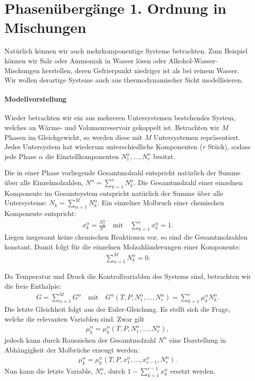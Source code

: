 \section{Phasenübergänge 1. Ordnung in Mischungen}
Natürlich können wir auch mehrkomponentige Systeme betrachten. Zum Beispiel können wir Salz oder Ammoniak in Wasser lösen oder Alkohol-Wasser-Mischungen herstellen, deren Gefrierpunkt niedriger ist als bei reinem Wasser.
Wir wollen derartige Systeme auch aus thermodynamischer Sicht modellisieren.
\paragraph*{Modellvorstellung}
Wieder betrachten wir ein aus mehreren Untersystemen bestehendes System, welches an Wärme- und Volumenreservoir gekoppelt ist. Betrachten wir $M$ Phasen im Gleichgewicht, so werden diese mit $M$ Untersystemen repräsentiert. Jedes Untersystem hat wiederum unterschiedliche Komponenten ($r$ Stück), sodass jede Phase $\alpha$ die Einstellkomponenten $N_1^\alpha,...,N_r^\alpha$ besitzt.

Die in einer Phase vorliegende Gesamtmolzahl entspricht natürlich der Summe über alle Einzelmolzahlen, $N^\alpha=\sum_{k=1}^{r}N_k^\alpha$. Die Gesamtmolzahl einer einzelnen Komponente im Gesamtsystem entspricht natürlich der Summe über alle Untersysteme: $N_k=\sum_{\alpha=1}^{M}N_k^\alpha$.
Ein einzelner Molbruch einer chemischen Komponente entspricht:
\begin{align*}
    x_k^\alpha=\frac{N_k^\alpha}{N^\alpha}\quad \mathrm{mit}\quad \sum_{k=1}^{r}x_k^\alpha=1.
\end{align*}
Liegen insgesamt keine chemischen Reaktionen vor, so sind die Gesamtmolzahlen konstant. Damit folgt für die einzelnen Molzahländerungen einer Komponente:
\begin{align*}
    \sum_{\alpha=1}^{M}N_k^\alpha=0.
\end{align*}

Da Temperatur und Druck die Kontrollvariablen des Systems sind, betrachten wir die freie Enthalpie:
\begin{align*}
    G=\sum_{\alpha=1}^{M}G^\alpha \quad \mathrm{mit} \quad G^\alpha(T,P,N_1^\alpha,...,N_r^\alpha)=\sum_{k=1}^{r}\mu_k^\alpha N_k^\alpha.
\end{align*}
Die letzte Gleichheit folgt aus der Euler-Gleichung. Es stellt sich die Frage, welche die relevanten Variablen sind.
Zwar gilt
\begin{align*}
    \mu_k^\alpha=\mu_k^\alpha(T,P,N_1^\alpha,...,N_r^\alpha),
\end{align*}
jedoch kann durch Rausziehen der Gesamtmolzahl $N^\alpha$ eine Darstellung in Abhängigkeit der Molbrüche erzeugt werden:
\begin{align*}
    \mu_k^\alpha=\mu_k^\alpha(T,P,x_1^\alpha,...,x_{r-1}^\alpha, N_r^\alpha).
\end{align*}
Nun kann die letzte Variable, $N_r^\alpha$, durch $1-\sum_{k=1}^{r-1}x_k^\alpha$ ersetzt werden.

